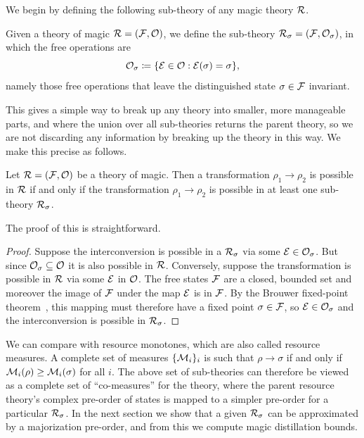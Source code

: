 \documentclass[pra,
aps,
twocolumn,
superscriptaddress,
groupedaddress,
nofootinbib,
reprint
]{revtex4-1}
\begin{document}
 We begin by defining the following sub-theory of any magic theory ${\mathcal R}$.
\begin{definition}\label{def:sigmafrag}
   Given a theory of magic ${\mathcal R} = ({\mathcal F}, {\mathcal O})$, we define the sub-theory ${\mathcal R}_\sigma = ({\mathcal F}, {\mathcal O}_\sigma)$, in which the free operations are 
   \begin{equation}
        {\mathcal O}_\sigma \coloneqq \{ {\mathcal E} \in {\mathcal O}: {\mathcal E}(\sigma) = \sigma \},
    \end{equation}
namely those free operations that leave the distinguished state $\sigma \in {\mathcal F}$ invariant.
\end{definition}
This gives a simple way to break up any theory into smaller, more manageable parts, and where the union over all sub-theories returns the parent theory, so we are not discarding any information by breaking up the theory in this way. We make this precise as follows.
\begin{theorem}\label{thm:frag}
    Let ${\mathcal R} = ({\mathcal F}, {\mathcal O})$ be a theory of magic.
Then a transformation $\rho_1 \rightarrow \rho_2$ is possible in ${\mathcal R}$ if and only if the transformation $\rho_1 \rightarrow \rho_2$ is possible in at least one sub-theory ${\mathcal R}_\sigma$.
\end{theorem}
The proof of this is straightforward.
\begin{proof}
   Suppose the interconversion is possible in a ${\mathcal R}_\sigma$ via some ${\mathcal E} \in {\mathcal O}_\sigma$. But since ${\mathcal O}_\sigma \subseteq {\mathcal O}$ it is also possible in ${\mathcal R}$. Conversely, suppose the transformation is possible in ${\mathcal R}$ via some ${\mathcal E}$ in ${\mathcal O}$. The free states ${\mathcal F}$ are a closed, bounded set and moreover the image of ${\mathcal F}$ under the map ${\mathcal E}$ is in ${\mathcal F}$. By the Brouwer fixed-point theorem~\cite{cit:brouwer}, this mapping must therefore have a fixed point $\sigma \in {\mathcal F}$, so ${\mathcal E} \in {\mathcal O}_\sigma$ and the interconversion is possible in ${\mathcal R}_\sigma$.
\end{proof}
We can compare with resource monotones, which are also called resource measures. A complete set of measures $\{{\mathcal M}_i\}_i$ is such that $\rho \rightarrow \sigma$ if and only if ${\mathcal M}_i(\rho) \ge {\mathcal M}_i(\sigma)$ for all $i$. The above set of sub-theories can therefore be viewed as a complete set of ``co-measures'' for the theory, where the parent resource theory's complex pre-order of states is mapped to a simpler pre-order for a particular ${\mathcal R}_\sigma$. In the next section we show that a given ${\mathcal R}_\sigma$ can be approximated by a majorization pre-order, and from this we compute magic distillation bounds.
\end{document}

